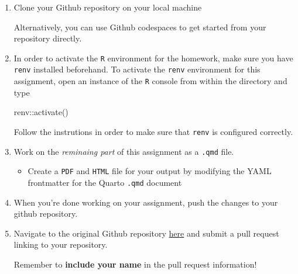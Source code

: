 \documentclass[
  letterpaper,
  DIV=11,
  numbers=noendperiod]{scrartcl}
\newenvironment{Shaded}{\begin{snugshade}}{\end{snugshade}}
\newcommand{\ExtensionTok}[1]{\textcolor[rgb]{0.00,0.23,0.31}{#1}}
\newcommand{\FunctionTok}[1]{\textcolor[rgb]{0.28,0.35,0.67}{#1}}
\newcommand{\NormalTok}[1]{\textcolor[rgb]{0.00,0.23,0.31}{#1}}
\newcommand{\OperatorTok}[1]{\textcolor[rgb]{0.37,0.37,0.37}{#1}}
\newcommand{\SpecialCharTok}[1]{\textcolor[rgb]{0.37,0.37,0.37}{#1}}
\newcommand{\StringTok}[1]{\textcolor[rgb]{0.13,0.47,0.30}{#1}}
\providecommand{\tightlist}{%
  \setlength{\itemsep}{0pt}\setlength{\parskip}{0pt}}\usepackage{longtable,booktabs,array}
\begin{document}
\begin{enumerate}
\def\labelenumi{\arabic{enumi}.}
\setcounter{enumi}{1}
\item
  Clone your Github repository on your local machine

\begin{Shaded}
\end{Shaded}

  Alternatively, you can use Github codespaces to get started from your
  repository directly.
\item
  In order to activate the \texttt{R} environment for the homework, make
  sure you have \texttt{renv} installed beforehand. To activate the
  \texttt{renv} environment for this assignment, open an instance of the
  \texttt{R} console from within the directory and type

\begin{Shaded}
\begin{Highlighting}[]
\NormalTok{renv}\SpecialCharTok{::}\FunctionTok{activate}\NormalTok{()}
\end{Highlighting}
\end{Shaded}

  Follow the instrutions in order to make sure that \texttt{renv} is
  configured correctly.
\item
  Work on the \emph{reminaing part} of this assignment as a
  \texttt{.qmd} file.

  \begin{itemize}
  \tightlist
  \item
    Create a \texttt{PDF} and \texttt{HTML} file for your output by
    modifying the YAML frontmatter for the Quarto \texttt{.qmd} document
  \end{itemize}
\item
  When you're done working on your assignment, push the changes to your
  github repository.
\item
  Navigate to the original Github repository
  \href{https://github.com/psu-stat380/hw-1}{here} and submit a pull
  request linking to your repository.

  Remember to \textbf{include your name} in the pull request
  information!
\end{enumerate}
\end{document}
